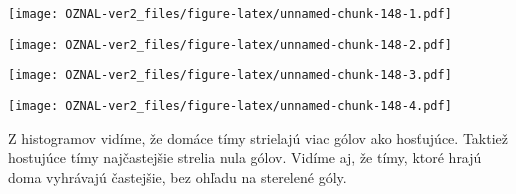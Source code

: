 \documentclass[
]{article}
\newenvironment{Shaded}{\begin{snugshade}}{\end{snugshade}}
\newcommand{\AttributeTok}[1]{\textcolor[rgb]{0.77,0.63,0.00}{#1}}
\newcommand{\DecValTok}[1]{\textcolor[rgb]{0.00,0.00,0.81}{#1}}
\newcommand{\FunctionTok}[1]{\textcolor[rgb]{0.00,0.00,0.00}{#1}}
\newcommand{\NormalTok}[1]{#1}
\newcommand{\OtherTok}[1]{\textcolor[rgb]{0.56,0.35,0.01}{#1}}
\newcommand{\SpecialCharTok}[1]{\textcolor[rgb]{0.00,0.00,0.00}{#1}}
\newcommand{\StringTok}[1]{\textcolor[rgb]{0.31,0.60,0.02}{#1}}
\begin{document}
\texttt{[image: OZNAL-ver2\_files/figure-latex/unnamed-chunk-148-1.pdf]}

\begin{Shaded}
\end{Shaded}

\texttt{[image: OZNAL-ver2\_files/figure-latex/unnamed-chunk-148-2.pdf]}

\begin{Shaded}
\end{Shaded}

\texttt{[image: OZNAL-ver2\_files/figure-latex/unnamed-chunk-148-3.pdf]}

\begin{Shaded}
\end{Shaded}

\texttt{[image: OZNAL-ver2\_files/figure-latex/unnamed-chunk-148-4.pdf]}

Z histogramov vidíme, že domáce tímy strielajú viac gólov ako hosťujúce.
Taktiež hostujúce tímy najčastejšie strelia nula gólov. Vidíme aj, že
tímy, ktoré hrajú doma vyhrávajú častejšie, bez ohľadu na sterelené
góly.

\begin{Shaded}
\end{Shaded}
\end{document}
